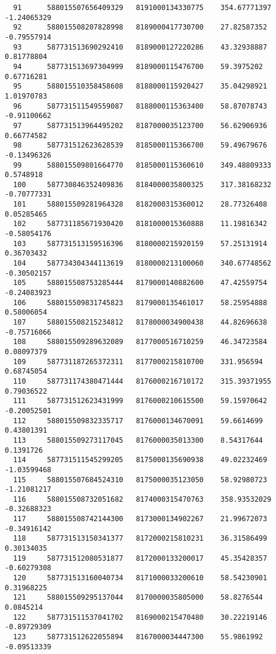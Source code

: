 \documentclass[a4paper,11pt]{article}
\begin{document}
\begin{verbatim}
  91      588015507656409329   8191000134330775    354.67771397   -1.24065329  
  92      588015508207828998   8189000417730700    27.82587352    -0.79557914  
  93      587731513690292410   8189000127220286    43.32938887    0.81778804   
  94      587731513697304999   8189000115476700    59.3975202     0.67716281   
  95      588015510358458608   8188000115920427    35.04298921    1.01970783   
  96      587731511549559087   8188000115363400    58.87078743    -0.91100662  
  97      587731513964495202   8187000035123700    56.62906936    0.66774582   
  98      587731512623628539   8185000115366700    59.49679676    -0.13496326  
  99      588015509801664770   8185000115360610    349.48809333   0.5748918    
  100     587730846352409836   8184000035800325    317.38168232   -0.70777331  
  101     588015509281964328   8182000315360012    28.77326408    0.05285465   
  102     587731185671930420   8181000015360888    11.19816342    -0.58054176  
  103     587731513159516396   8180000215920159    57.25131914    0.36703432   
  104     587734304344113619   8180000213100060    340.67748562   -0.30502157  
  105     588015508753285444   8179000140882600    47.42559754    -0.24083923  
  106     588015509831745823   8179000135461017    58.25954888    0.58006054   
  107     588015508215234812   8178000034900438    44.82696638    -0.75716066  
  108     588015509289632089   8177000516710259    46.34723584    0.08097379   
  109     587731187265372311   8177000215810700    331.956594     0.68745054   
  110     587731174380471444   8176000216710172    315.39371955   0.79036522   
  111     587731512623431999   8176000210615500    59.15970642    -0.20052501  
  112     588015509832335717   8176000134670091    59.6614699     0.43801391   
  113     588015509273117045   8176000035013300    8.54317644     0.1391726    
  114     587731511545299205   8175000135690938    49.02232469    -1.03599468  
  115     588015507684524310   8175000035123050    58.92980723    -1.21081217  
  116     588015508732051682   8174000315470763    358.93532029   -0.32688323  
  117     588015508742144300   8173000134902267    21.99672073    -0.34916142  
  118     587731513150341377   8172000215810231    36.31586499    0.30134035   
  119     587731512080531877   8172000133200017    45.35428357    -0.60279308  
  120     587731513160040734   8171000033200610    58.54230901    0.31968225   
  121     588015509295137044   8170000035805000    58.8276544     0.0845214    
  122     587731511537041702   8169000215470480    30.22219146    -0.89729309  
  123     587731512622055894   8167000034447300    55.9861992     -0.09513339  

\end{verbatim}
\end{document}

